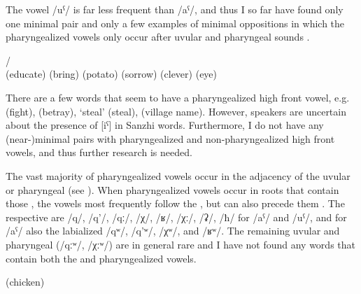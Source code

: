 The vowel /uˁ/ is far less frequent than /aˁ/, and thus I so far have found only one minimal pair and only a few examples of minimal oppositions in which the pharyngealized vowels only occur after uvular and pharyngeal sounds .
%
\begin{exe}
	\ex	\label{ex:pharyngealization minimal pairs B phon@A}
	\begin{xlist}
	\TabPositions{15em}
		\ex	{} /   \tab {} \\
		(educate) \tab (bring)
		\ex	{}  (potato) \tab {}  (sorrow)
		\ex	{} 		\tab {}  (clever)
		\ex	{} 		\tab {}  (eye)
	\end{xlist}
\end{exe}

There are a few words that seem to have a pharyngealized high front vowel, e.g.   (fight),   (betray),  `steal' (steal),  (village name). However, speakers are uncertain about the presence of [iˁ] in Sanzhi words. Furthermore, I do not have any (near-)minimal pairs with pharyngealized and non-pharyngealized high front vowels, and thus further research is needed.

The vast majority of pharyngealized vowels occur in the adjacency of the uvular or pharyngeal  (see ). When pharyngealized vowels occur in roots that contain those , the vowels most frequently follow the , but can also precede them . The respective  are /q/, /q'/, /qː/, /χ/, /ʁ/, /χː/, /ʡ/, /ħ/ for /aˁ/ and /uˁ/, and for /aˁ/ also the labialized  /qʷ/, /q'ʷ/, /χʷ/, and /ʁʷ/. The remaining uvular and pharyngeal  (/qːʷ/, /χːʷ/) are in general rare and I have not found any words that contain both the  and pharyngealized vowels.
%
\begin{exe}
	\ex	\label{ex:uvular pharyngealphon1}
\TabPositions{15em}
  (chicken)	\tab {} 	\\
 	\tab {} 	\\
 	\tab {} 	\\
 	
\end{exe}

